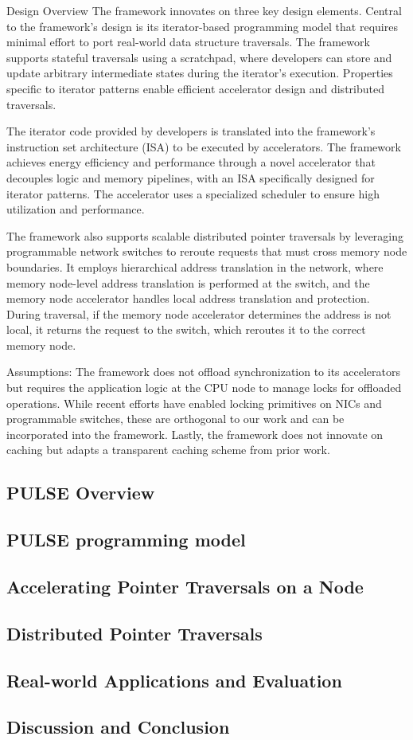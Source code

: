 Design Overview
The framework innovates on three key design elements. Central to the framework’s design is its iterator-based programming model that requires minimal effort to port real-world data structure traversals. The framework supports stateful traversals using a scratchpad, where developers can store and update arbitrary intermediate states during the iterator's execution. Properties specific to iterator patterns enable efficient accelerator design and distributed traversals.

The iterator code provided by developers is translated into the framework’s instruction set architecture (ISA) to be executed by accelerators. The framework achieves energy efficiency and performance through a novel accelerator that decouples logic and memory pipelines, with an ISA specifically designed for iterator patterns. The accelerator uses a specialized scheduler to ensure high utilization and performance.

The framework also supports scalable distributed pointer traversals by leveraging programmable network switches to reroute requests that must cross memory node boundaries. It employs hierarchical address translation in the network, where memory node-level address translation is performed at the switch, and the memory node accelerator handles local address translation and protection. During traversal, if the memory node accelerator determines the address is not local, it returns the request to the switch, which reroutes it to the correct memory node.

Assumptions: The framework does not offload synchronization to its accelerators but requires the application logic at the CPU node to manage locks for offloaded operations. While recent efforts have enabled locking primitives on NICs and programmable switches, these are orthogonal to our work and can be incorporated into the framework. Lastly, the framework does not innovate on caching but adapts a transparent caching scheme from prior work.








\subsection{PULSE Overview}
\subsection{PULSE programming model}
\subsection{Accelerating Pointer Traversals on a Node}
\subsection{Distributed Pointer Traversals}
\subsection{Real-world Applications and Evaluation}
\subsection{Discussion and Conclusion}
